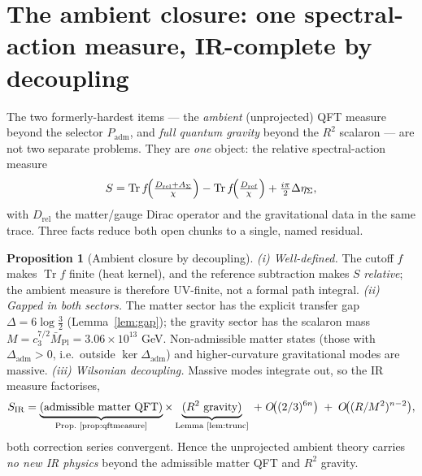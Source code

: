 \documentclass[11pt,a4paper]{article}
\newcommand{\Mbar}{\bar M_{\mathrm{Pl}}}
\newcommand{\cthree}{c_3}
\theoremstyle{definition}
\newtheorem{proposition}{Proposition}
\begin{document}
\section{The ambient closure: one spectral-action measure, IR-complete by decoupling}
The two formerly-hardest items --- the \emph{ambient} (unprojected) QFT measure beyond the selector
$P_{\mathrm{adm}}$, and \emph{full quantum gravity} beyond the $R^2$ scalaron --- are not two separate
problems. They are \emph{one} object: the relative spectral-action measure
\[
  S=\operatorname{Tr}f\!\Bigl(\tfrac{D_{\mathrm{rel}}+A_\Sigma}{\chi}\Bigr)
    -\operatorname{Tr}f\!\Bigl(\tfrac{D_{\mathrm{ref}}}{\chi}\Bigr)+\tfrac{i\pi}{2}\Delta\eta_\Sigma ,
\]
with $D_{\mathrm{rel}}$ the matter/gauge Dirac operator and the gravitational data in the same trace.
Three facts reduce both open chunks to a single, named residual.

\begin{proposition}[Ambient closure by decoupling]
\label{prop:ambient}
\emph{(i) Well-defined.} The cutoff $f$ makes $\operatorname{Tr}f$ finite (heat kernel), and the reference
subtraction makes $S$ \emph{relative}; the ambient measure is therefore UV-finite, not a formal path
integral. \emph{(ii) Gapped in both sectors.} The matter sector has the explicit transfer gap
$\Delta=6\log\tfrac32$ (Lemma~\ref{lem:gap}); the gravity sector has the scalaron mass
$M=\cthree^{7/2}\Mbar=3.06\times10^{13}$ GeV. Non-admissible matter states (those with
$\Delta_{\mathrm{adm}}>0$, i.e.\ outside $\ker\Delta_{\mathrm{adm}}$) and higher-curvature gravitational
modes are massive. \emph{(iii) Wilsonian decoupling.} Massive modes integrate out, so the IR measure
factorises,
\[
  S_{\mathrm{IR}}=\underbrace{(\text{admissible matter QFT})}_{\text{Prop.~\ref{prop:qftmeasure}}}
  \times\underbrace{(R^2\ \text{gravity})}_{\text{Lemma~\ref{lem:trunc}}}
  \;+\;O\!\bigl((2/3)^{6n}\bigr)\;+\;O\!\bigl((R/M^2)^{n-2}\bigr),
\]
both correction series convergent. Hence the unprojected ambient theory carries \emph{no new IR physics}
beyond the admissible matter QFT and $R^2$ gravity.
\end{proposition}
\end{document}
